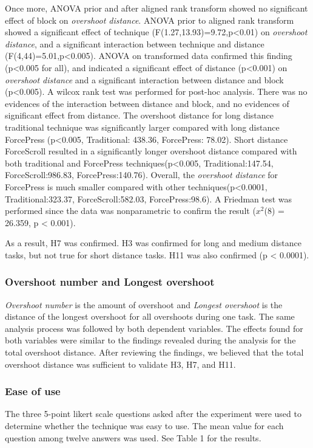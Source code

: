 \documentclass{sigchi}
\begin{document}
Once more, ANOVA prior and after aligned rank transform showed no significant effect of block on \textit{overshoot distance}. ANOVA prior to aligned rank transform showed a significant effect of technique (F(1.27,13.93)=9.72,p<0.01) on \textit{overshoot distance}, and a significant interaction between technique and distance (F(4,44)=5.01,p<0.005). ANOVA on transformed data confirmed this finding (p<0.005 for all), and indicated a significant effect of distance (p<0.001) on \textit{overshoot distance} and a significant interaction between distance and block (p<0.005). A wilcox rank test was performed for post-hoc analysis. There was no evidences of the interaction between distance and block, and no evidences of significant effect from distance. The overshoot distance for long distance traditional technique was significantly larger compared with long distance ForcePress (p<0.005, Traditional: 438.36, ForcePress: 78.02). Short distance ForceScroll resulted in a significantly longer overshoot distance compared with both traditional and ForcePress techniques(p<0.005, Traditional:147.54, ForceScroll:986.83, ForcePress:140.76). Overall, the \textit{overshoot distance} for ForcePress is much smaller compared with other techniques(p<0.0001, Traditional:323.37, ForceScroll:582.03, ForcePress:98.6). A Friedman test was performed since the data was nonparametric to confirm the result ($x^{2}$(8) = 26.359, p < 0.001).

As a result, H7 was confirmed. H3 was confirmed for long and medium distance tasks, but not true for short distance tasks. H11 was also confirmed (p < 0.0001).  

\subsubsection{Overshoot number and Longest overshoot}
\textit{Overshoot number} is the amount of overshoot and \textit{Longest overshoot} is the distance of the longest overshoot for all overshoots during one task. The same analysis process was followed by both dependent variables. The effects found for both variables were similar to the findings revealed during the analysis for the total overshoot distance. After reviewing the findings, we believed that the total overshoot distance was sufficient to validate H3, H7, and H11.    

\subsubsection{Ease of use}
The three 5-point likert scale questions asked after the experiment were used to determine whether the technique was easy to use. The mean value for each question among twelve answers was used. See Table 1 for the results.
\end{document}
